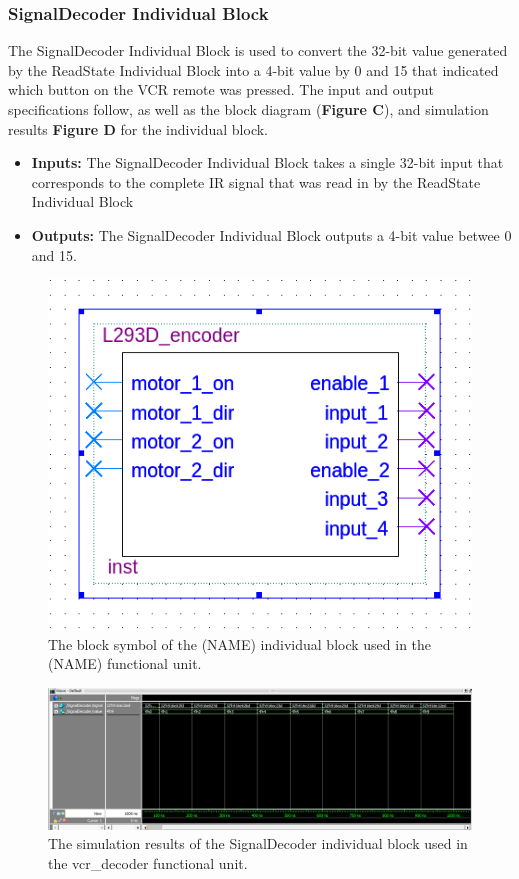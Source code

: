 \documentclass[a4paper]{article}
\begin{document}
\clearpage



\subsubsection{SignalDecoder Individual Block}
The SignalDecoder Individual Block is used to convert the 32-bit value generated by the ReadState Individual Block into a 4-bit value by 0 and 15 that indicated which button on the VCR remote was pressed. The input and output specifications follow, as well as the block diagram (\textbf{Figure C}), and simulation results \textbf{Figure D} for the individual block.
\begin{itemize}
  \item \textbf{Inputs:  } The SignalDecoder Individual Block takes a single 32-bit input that corresponds to the complete IR signal that was read in by the ReadState Individual Block
  \item \textbf{Outputs: } The SignalDecoder Individual Block outputs a 4-bit value betwee 0 and 15.
\end{itemize}
\begin{figure}[h]
  \centering
  \includegraphics[width=.48\textwidth]{symbols/individual_placeholder.png}
  \caption{The block symbol of the (NAME) individual block used in the (NAME) functional unit.}
    \label{fig:individual-1-2-block}
\end{figure}
\begin{figure}[h]
  \centering
  \includegraphics[width=.98\textwidth]{sims/vcr_testing/moduleTests/SignalDecoder/SignalDecoderTest.png}
  \caption{The simulation results of the SignalDecoder individual block used in the vcr\_decoder functional unit.}
    \label{fig:individual-1-2-sim}
\end{figure}
\end{document}
